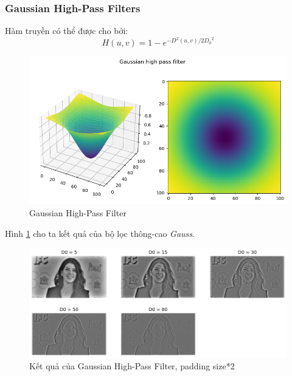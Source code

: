 \documentclass{article}
\begin{document}
        \subsubsection{Gaussian High-Pass Filters}
        Hàm truyền có thể được cho bởi:
        $$H(u,v) = 1-e^{-D^2(u,v)/2{D_0}^2}$$
        \begin{figure}[ht!]
        \centering
        \includegraphics[width = \linewidth]{fo20.png}
        \caption{Gaussian High-Pass Filter}
        \label{fig21}
        \end{figure}
        Hình \ref{fig21} cho ta kết quả của bộ lọc thông-cao \textit{Gauss}.
         \begin{figure}[ht!]
        \centering
        \includegraphics[width = \linewidth]{fo21.png}
        \caption{Kết quả của Gaussian High-Pass Filter, padding size*2}
        \label{fig22}
        \end{figure}
        
        
\end{document}
